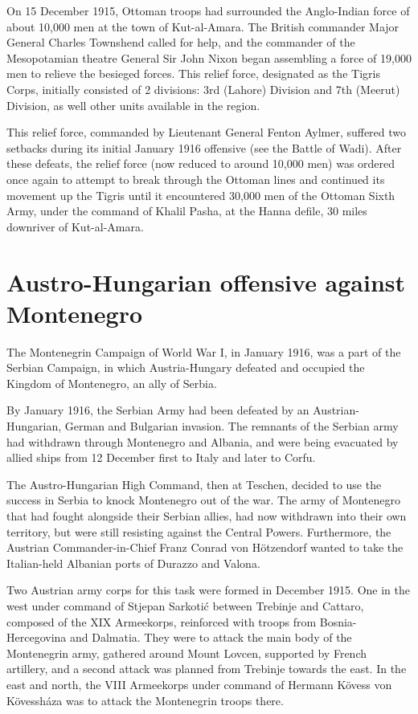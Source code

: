 \documentclass[a4paper,]{book}
\begin{document}
On 15 December 1915, Ottoman troops had surrounded the Anglo-Indian force of about 10,000 men at the town of Kut-al-Amara. The British commander Major General Charles Townshend called for help, and the commander of the Mesopotamian theatre General Sir John Nixon began assembling a force of 19,000 men to relieve the besieged forces. This relief force, designated as the Tigris Corps, initially consisted of 2 divisions: 3rd (Lahore) Division and 7th (Meerut) Division, as well other units available in the region.

This relief force, commanded by Lieutenant General Fenton Aylmer, suffered two setbacks during its initial January 1916 offensive (see the Battle of Wadi). After these defeats, the relief force (now reduced to around 10,000 men) was ordered once again to attempt to break through the Ottoman lines and continued its movement up the Tigris until it encountered 30,000 men of the Ottoman Sixth Army, under the command of Khalil Pasha, at the Hanna defile, 30 miles downriver of Kut-al-Amara.

\section{Austro-Hungarian offensive against Montenegro}

The Montenegrin Campaign of World War I, in January 1916, was a part of the Serbian Campaign, in which Austria-Hungary defeated and occupied the Kingdom of Montenegro, an ally of Serbia.

By January 1916, the Serbian Army had been defeated by an Austrian-Hungarian, German and Bulgarian invasion. The remnants of the Serbian army had withdrawn through Montenegro and Albania, and were being evacuated by allied ships from 12 December first to Italy and later to Corfu.

The Austro-Hungarian High Command, then at Teschen, decided to use the success in Serbia to knock Montenegro out of the war. The army of Montenegro that had fought alongside their Serbian allies, had now withdrawn into their own territory, but were still resisting against the Central Powers. Furthermore, the Austrian Commander-in-Chief Franz Conrad von Hötzendorf wanted to take the Italian-held Albanian ports of Durazzo and Valona.

Two Austrian army corps for this task were formed in December 1915. One in the west under command of Stjepan Sarkotić between Trebinje and Cattaro, composed of the XIX Armeekorps, reinforced with troops from Bosnia-Hercegovina and Dalmatia. They were to attack the main body of the Montenegrin army, gathered around Mount Lovcen, supported by French artillery, and a second attack was planned from Trebinje towards the east. In the east and north, the VIII Armeekorps under command of Hermann Kövess von Kövessháza was to attack the Montenegrin troops there. 
\end{document}

